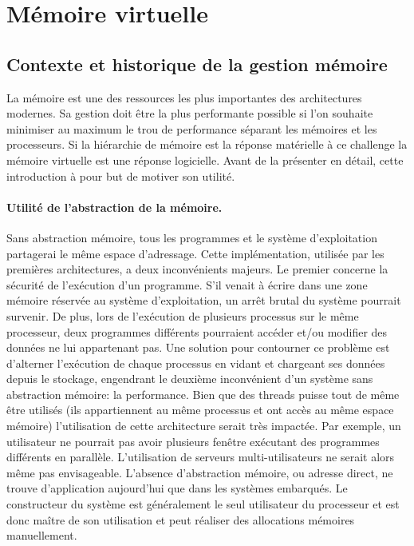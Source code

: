 \section{Mémoire virtuelle} \label{sec:memoire_virtuelle}


\subsection{Contexte et historique de la gestion mémoire}

La mémoire est une des ressources les plus importantes des architectures modernes. Sa gestion doit être la plus performante possible  si l'on souhaite minimiser au maximum le trou de performance séparant les mémoires et les processeurs. Si la hiérarchie de mémoire est la réponse matérielle à ce challenge la mémoire virtuelle est une réponse logicielle. Avant de la présenter en détail, cette introduction à pour but de motiver son utilité.

\paragraph{Utilité de l'abstraction de la mémoire.} Sans abstraction mémoire, tous les programmes et le système d'exploitation partagerai le même espace d'adressage. Cette implémentation, utilisée par les premières architectures, a deux inconvénients majeurs. Le premier concerne la sécurité de l'exécution d'un programme. S'il venait à écrire dans une zone mémoire réservée au système d'exploitation, un arrêt brutal du système pourrait survenir. De plus, lors de l'exécution de plusieurs processus sur le même processeur, deux programmes différents pourraient accéder et/ou modifier des données ne lui appartenant pas. Une solution pour contourner ce problème est d'alterner l'exécution de chaque processus en vidant et chargeant ses données depuis le stockage, engendrant le deuxième inconvénient d'un système sans abstraction mémoire: la performance. Bien que des threads puisse tout de même être utilisés (ils appartiennent au même processus et ont accès au même espace mémoire) l'utilisation de cette architecture serait très impactée. Par exemple, un utilisateur ne pourrait pas avoir plusieurs fenêtre exécutant des programmes différents en parallèle. L'utilisation de serveurs multi-utilisateurs ne serait alors même pas envisageable. L'absence d'abstraction mémoire, ou adresse direct, ne trouve d'application aujourd'hui que dans les systèmes embarqués. Le constructeur du système est généralement le seul utilisateur du processeur et est donc maître de son utilisation et peut réaliser des allocations mémoires manuellement.

